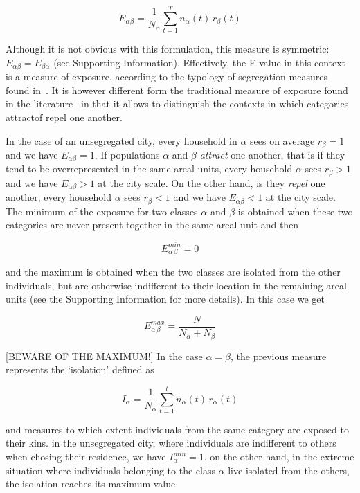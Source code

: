 \begin{equation} 
    E_{\alpha \beta} = \frac{1}{N_\alpha} \sum_{t=1}^{T} n_\alpha(t)\,r_\beta(t) 
\end{equation}

Although it is not obvious with this formulation, this measure is symmetric:
$E_{\alpha \beta} = E_{\beta \alpha}$ (see Supporting Information). Effectively, the E-value in this context is a measure of exposure,
according to the typology of segregation measures found in~\cite{Massey:1988}.
It is however different form the traditional measure of exposure found in the
literature~\cite{Bell:1954} in that it allows to distinguish the contexts in
which categories attractof repel one another.

In the case of an unsegregated city, every household in $\alpha$ sees
on average $r_\beta = 1$ and we have $E_{\alpha \beta} = 1$. If
populations $\alpha$ and $\beta$ {\em attract} one another, that is if
they tend to be overrepresented in the same areal units, every
household $\alpha$ sees $r_\beta > 1$ and we have
$E_{\alpha \beta} > 1$ at the city scale. On the other hand, is they
{\em repel} one another, every household $\alpha$ sees $r_\beta < 1$
and we have $E_{\alpha \beta} <1$ at the city scale. The minimum of
the exposure for two classes $\alpha$ and $\beta$ is obtained when
these two categories are never present together in the same areal unit
and then

\begin{equation}
    E_{\alpha\,\beta}^{min} = 0 
\end{equation}

and the maximum is obtained when the two classes are isolated from the other
individuals, but are otherwise indifferent to their location in the remaining
areal units (see the Supporting Information for more details). In this case we get

\begin{equation}
    E_{\alpha\,\beta}^{max} = \frac{N}{N_\alpha + N_\beta}
\end{equation}

[BEWARE OF THE MAXIMUM!]
In the case $\alpha = \beta$, the previous measure represents the
`isolation' defined as

\begin{equation}
    I_\alpha = \frac{1}{N_\alpha}\sum_{t=1}^{t} n_\alpha(t)\,r_\alpha(t)
\end{equation}

and measures to which extent individuals from the same category are
exposed to their kins. in the unsegregated city, where individuals are
indifferent to others when chosing their residence, we have
$I_\alpha^{min}=1$. on the other hand, in the extreme situation where
individuals belonging to the class $\alpha$ live isolated from the
others, the isolation reaches its maximum value

